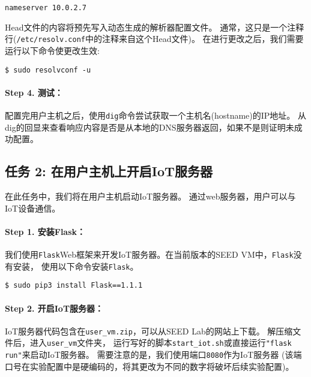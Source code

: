 \begin{lstlisting}
nameserver 10.0.2.7
\end{lstlisting}

Head文件的内容将预先写入动态生成的解析器配置文件。
通常，这只是一个注释行(\texttt{/etc/resolv.conf}中的注释来自这个Head文件)。
在进行更改之后，我们需要运行以下命令使更改生效:

\begin{lstlisting}
$ sudo resolvconf -u
\end{lstlisting}


\paragraph{Step 4. 测试：}
配置完用户主机之后，使用\texttt{dig}命令尝试获取一个主机名(hostname)的IP地址。
从dig的回显来查看响应内容是否是从本地的DNS服务器返回，如果不是则证明未成功配置。



\subsection{任务 2: 在用户主机上开启IoT服务器}

在此任务中，我们将在用户主机启动IoT服务器。
通过web服务器，用户可以与IoT设备通信。


\paragraph{Step 1. 安装Flask：}

我们使用\texttt{Flask}Web框架来开发IoT服务器。在当前版本的SEED VM中，\texttt{Flask}没有安装，
使用以下命令安装\texttt{Flask}。

\begin{lstlisting}
$ sudo pip3 install Flask==1.1.1
\end{lstlisting}


\paragraph{Step 2. 开启IoT服务器：}
IoT服务器代码包含在\texttt{user\_vm.zip}，可以从SEED Lab的网站上下载。
解压缩文件后，进入\texttt{user\_vm}文件夹，
运行写好的脚本\texttt{start\_iot.sh}或直接运行\texttt{"flask run"}来启动IoT服务器。
需要注意的是，我们使用端口\texttt{8080}作为IoT服务器
(该端口号在实验配置中是硬编码的，将其更改为不同的数字将破坏后续实验配置)。



